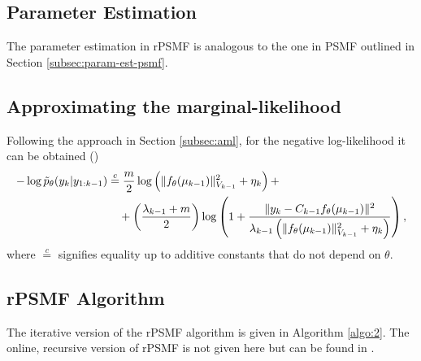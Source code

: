 \documentclass{mldsmsc}
\begin{document}
\subsection{Parameter Estimation}

The parameter estimation in rPSMF is analogous to the one in PSMF outlined in Section \ref{subsec:param-est-psmf}.

\subsection{Approximating the marginal-likelihood}

Following the approach in Section \ref{subsec:aml}, for the negative log-likelihood it can be obtained (\cite{akyildiz2021probabilistic})
\begin{align}
    -\log \Tilde{p}_{\theta}(y_k | y_{1:k-1}) &\overset{c}{=} \frac{m}{2} \log \left(\Vert f_{\theta}(\mu_{k-1}) \Vert_{V_{k-1}}^2 + \eta_k\right) + \nonumber \\
    &\quad + \left(\frac{\lambda_{k-1} + m}{2}\right) \log \left(1 + \frac{\Vert y_k - C_{k-1} f_{\theta}(\mu_{k-1}) \Vert^2}{\lambda_{k-1}\left(\Vert f_{\theta}(\mu_{k-1}) \Vert^2_{V_{k-1}} + \eta_k\right)}\right),
\end{align}
where $\overset{c}{=}$ signifies equality up to additive constants that do not depend on $\theta$.

\subsection{rPSMF Algorithm}

The iterative version of the rPSMF algorithm is given in Algorithm \ref{algo:2}. The online, recursive version of rPSMF is not given here but can be found in \cite{akyildiz2021probabilistic}.
\end{document}
